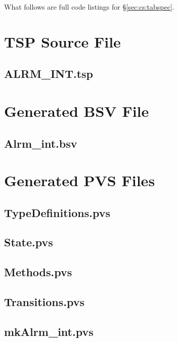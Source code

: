 What follows are full code listings for \S \ref{sec:cs:tabspec}.  

\section{TSP Source File} \label{app:alarm:tsp}
\subsection{ALRM\_INT.tsp} \label{app:alarm:tsp:alrm}


\section{Generated BSV File} \label{app:alarm:bsv}
\subsection{Alrm\_int.bsv} \label{app:alarm:bsv:bsv}


\section{Generated PVS Files} \label{app:alarm:pvsgen}
\subsection{TypeDefinitions.pvs} \label{app:alarm:pvsgen:td}


\subsection{State.pvs} \label{app:alarm:pvsgen:state}


\subsection{Methods.pvs} \label{app:alarm:pvsgen:meth}


\subsection{Transitions.pvs} \label{app:alarm:pvsgen:trans}


\subsection{mkAlrm\_int.pvs} \label{app:alarm:pvsgen:top}

